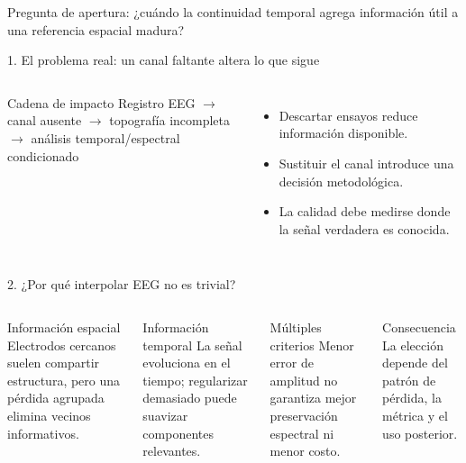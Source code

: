 \documentclass[aspectratio=169,10pt]{beamer}
\title{\DefenseTitle}
\subtitle{Defensa de título · \DefenseDegree}
\author{\DefenseAuthor}
\institute{\DefenseDepartment\\\DefenseInstitution\\[0.35em]\DefenseAdvisor}
\date{\DefenseDate}
\begin{document}
{
\begin{frame}[plain]
  \titlepage
  \vfill
  {\color{USMLight}\small Pregunta de apertura: ¿cuándo la continuidad temporal agrega información útil a una referencia espacial madura?}
  \vspace*{0.28cm}
\end{frame}}
\setcounter{framenumber}{0}

\begin{frame}{1. El problema real: un canal faltante altera lo que sigue}
\begin{columns}[T,onlytextwidth]
\begin{block}{Cadena de impacto}
\centering
\Large Registro EEG $\longrightarrow$ canal ausente $\longrightarrow$ topografía incompleta\\[0.5em]
$\longrightarrow$ análisis temporal/espectral condicionado
\end{block}
\vspace{0.5em}
\begin{itemize}
\item Descartar ensayos reduce información disponible.
\item Sustituir el canal introduce una decisión metodológica.
\item La calidad debe medirse donde la señal verdadera es conocida.
\end{itemize}
\vspace{0.7em}
\centering{}
\end{columns}
\end{frame}

\begin{frame}{2. ¿Por qué interpolar EEG no es trivial?}
\begin{columns}[T,onlytextwidth]
\begin{block}{Información espacial}
Electrodos cercanos suelen compartir estructura, pero una pérdida agrupada elimina vecinos informativos.
\end{block}
\begin{block}{Información temporal}
La señal evoluciona en el tiempo; regularizar demasiado puede suavizar componentes relevantes.
\end{block}
\begin{block}{Múltiples criterios}
Menor error de amplitud no garantiza mejor preservación espectral ni menor costo.
\end{block}
\begin{block}{Consecuencia}
La elección depende del patrón de pérdida, la métrica y el uso posterior.
\end{block}
\end{columns}
\end{frame}
\end{document}

